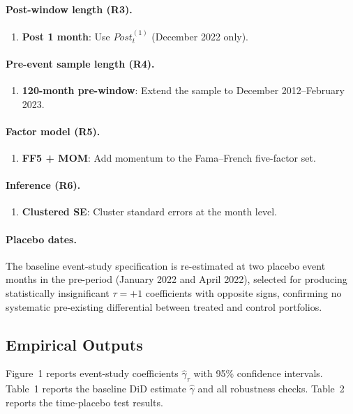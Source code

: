 \documentclass[11pt]{article}
\begin{document}
\paragraph{Post-window length (R3).}

\begin{enumerate}[label=R\arabic*., start=3, leftmargin=*]
  \item \textbf{Post 1 month}: Use $Post^{(1)}_t$ (December 2022 only).
\end{enumerate}

\paragraph{Pre-event sample length (R4).}

\begin{enumerate}[label=R\arabic*., start=4, leftmargin=*]
  \item \textbf{120-month pre-window}: Extend the sample to December 2012--February 2023.
\end{enumerate}

\paragraph{Factor model (R5).}

\begin{enumerate}[label=R\arabic*., start=5, leftmargin=*]
  \item \textbf{FF5 + MOM}: Add momentum to the Fama--French five-factor set.
\end{enumerate}

\paragraph{Inference (R6).}

\begin{enumerate}[label=R\arabic*., start=6, leftmargin=*]
  \item \textbf{Clustered SE}: Cluster standard errors at the month level.
\end{enumerate}

\paragraph{Placebo dates.}

The baseline event-study specification is re-estimated at two placebo event months in the pre-period (January 2022 and April 2022), selected for producing statistically insignificant $\tau=+1$ coefficients with opposite signs, confirming no systematic pre-existing differential between treated and control portfolios.

\subsection{Empirical Outputs}

Figure~1 reports event-study coefficients $\widehat{\gamma}_{\tau}$ with 95\% confidence intervals. Table~1 reports the baseline DiD estimate $\widehat{\gamma}$ and all robustness checks. Table~2 reports the time-placebo test results.
\end{document}
